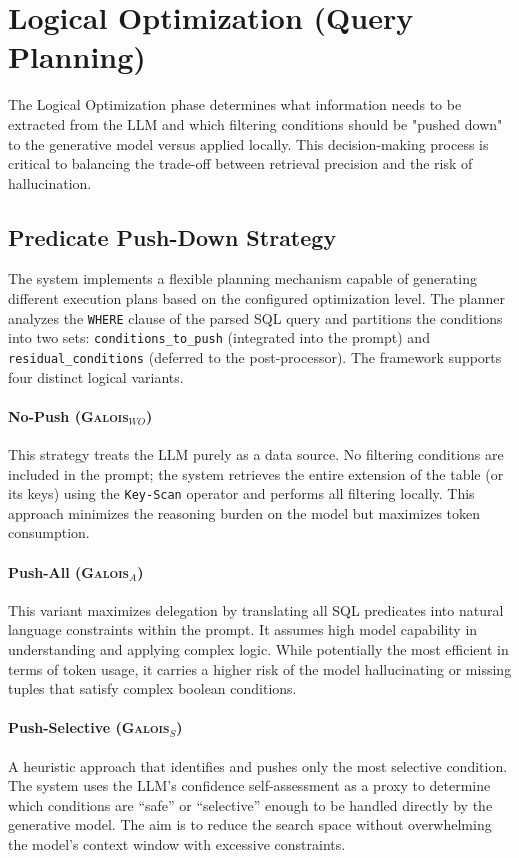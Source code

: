 \section{Logical Optimization (Query Planning)}

The Logical Optimization phase determines what information needs to be extracted from the LLM and which filtering conditions should be "pushed down" to the generative model versus applied locally. This decision-making process is critical to balancing the trade-off between retrieval precision and the risk of hallucination.

\subsection{Predicate Push-Down Strategy}

The system implements a flexible planning mechanism capable of generating different execution plans based on the configured optimization level. The planner analyzes the \texttt{WHERE} clause of the parsed SQL query and partitions the conditions into two sets: \texttt{conditions\_to\_push} (integrated into the prompt) and \texttt{residual\_conditions} (deferred to the post-processor). The framework supports four distinct logical variants.

\paragraph{No-Push (\textsc{Galois}$_{WO}$)}
This strategy treats the LLM purely as a data source. No filtering conditions are included in the prompt; the system retrieves the entire extension of the table (or its keys) using the \texttt{Key-Scan} operator and performs all filtering locally. This approach minimizes the reasoning burden on the model but maximizes token consumption.

\paragraph{Push-All (\textsc{Galois}$_{A}$)}
This variant maximizes delegation by translating all SQL predicates into natural language constraints within the prompt. It assumes high model capability in understanding and applying complex logic. While potentially the most efficient in terms of token usage, it carries a higher risk of the model hallucinating or missing tuples that satisfy complex boolean conditions.

\paragraph{Push-Selective (\textsc{Galois}$_{S}$)}
A heuristic approach that identifies and pushes only the most selective condition. The system uses the LLM's confidence self-assessment as a proxy to determine which conditions are “safe” or “selective” enough to be handled directly by the generative model. The aim is to reduce the search space without overwhelming the model's context window with excessive constraints.

